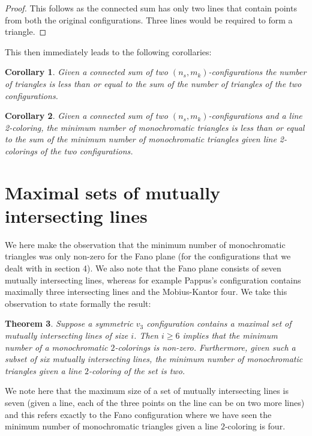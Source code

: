 \documentclass{article}
\newtheorem{thm}{Theorem}[section]
\newtheorem{cor}[thm]{Corollary}
\theoremstyle{definition}
\theoremstyle{remark}
\theoremstyle{definition}
\begin{document}
\begin{proof}
This follows as the connected sum has only two lines that contain points from both the original configurations. Three lines would be required to form a triangle.
\end{proof}

This then immediately leads to the following corollaries:

\begin{cor}
Given a connected sum of two $(n_{s},m_{k})$-configurations the number of triangles is less than or equal to the sum of the number of triangles of the two configurations.
\end{cor}


\begin{cor}
Given a connected sum of two $(n_{s},m_{k})$-configurations and a line 2-coloring, the minimum number of monochromatic triangles is less than or equal to the sum of the minimum number of monochromatic triangles given line 2-colorings of the two configurations.
\end{cor}

\section{Maximal sets of mutually intersecting lines}

We here make the observation that the minimum number of monochromatic triangles was only non-zero for the Fano plane (for the configurations that we dealt with in section 4). We also note that the Fano plane consists of seven mutually intersecting lines, whereas for example Pappus's configuration contains maximally three intersecting lines and the Mobius-Kantor four. We take this observation to state formally the result:

\begin{thm}
Suppose a symmetric $v_{3}$ configuration contains a maximal set of mutually intersecting lines of size $i$. Then $i\geq6$ implies that the minimum number of a monochromatic $2$-colorings is non-zero. Furthermore, given such a subset of six mutually intersecting lines, the minimum number of monochromatic triangles given a line $2$-coloring of the set is two.
\end{thm}

We note here that the maximum size of a set of mutually intersecting lines is seven (given a line, each of the three points on the line can be on two more lines) and this refers exactly to the Fano configuration where we have seen the minimum number of monochromatic triangles given a line $2$-coloring is four.
\end{document}
